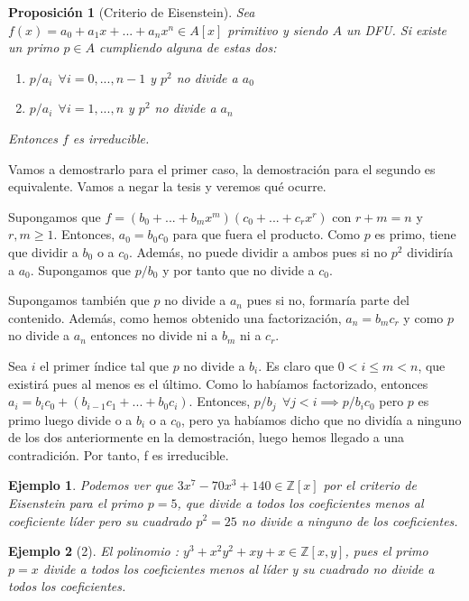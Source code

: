 \documentclass[11pt, a4paper, titlepage]{article}
\makeatletter
\newif\IfInSansMode
\let\oldsf\sffamily
\renewcommand*{\sffamily}{\oldsf\mathversion{sans}\InSansModetrue}
\let\oldnorm\normalfont
\renewcommand*{\normalfont}{\oldnorm\InSansModefalse\mathversion{normal}}
\renewenvironment{proof}[1][\proofname] {\vspace{-15pt}\par\pushQED{\qed}\normalfont\topsep6\p@\@plus6\p@\relax\trivlist\item[\hskip\labelsep\it#1\@addpunct{.}]\ignorespaces}{\popQED\endtrivlist\@endpefalse}
\providecommand{\ent}{\mathbb{Z}}
\renewenvironment{proof}[1][\proofname] {\par\pushQED{\qed}\normalfont\topsep6\p@\@plus6\p@\relax\trivlist\item[\hskip\labelsep\itshape\sffamily#1\@addpunct{.}]\ignorespaces}{\popQED\endtrivlist\@endpefalse}
\theoremstyle{theorem-style}
\newtheorem{nprop}{Proposición}[section]
\theoremstyle{definition-style}
\theoremstyle{remark-style}
\theoremstyle{example-style}
\newtheorem{ejemplo}{Ejemplo}[section]
\makeatother
\begin{document}
\begin{nprop}[Criterio de Eisenstein]
	Sea $f(x)=a_0+a_1x+...+a_nx^n \in A[x]$ primitivo y siendo $A$ un DFU.
Si existe un primo $p\in A$ cumpliendo alguna de estas dos:
	\begin{enumerate}
	\item $p/a_i \ \ \forall i = 0,...,n-1$ y $p^2$ no divide a $a_0$
	\item $p/a_i \ \ \forall i=1,...,n$ y $p^2$ no divide a $a_n$
\end{enumerate}
Entonces $f$ es irreducible.

\end{nprop}
\begin{proof}
	Vamos a demostrarlo para el primer caso, la demostración para el segundo es equivalente. Vamos a negar la tesis y veremos qué ocurre.

	Supongamos que $f=(b_0+...+b_mx^m)(c_0+...+c_rx^r)$ con $r+m=n$ y $r,m \geq 1$. Entonces, $a_0=b_0c_0$ para que fuera el producto. Como $p$ es primo, tiene que dividir a $b_0$ o a $c_0$. Además, no puede dividir a ambos pues si no $p^2$ dividiría a $a_0$. Supongamos que $p/b_0$ y por tanto que no divide a $c_0$.

	Supongamos también que $p$ no divide a $a_n$ pues si no, formaría parte del contenido. Además, como hemos obtenido una factorización, $a_n = b_mc_r$ y como $p$ no divide a $a_n$ entonces no divide ni a $b_m$ ni a $c_r$.

	Sea $i$ el primer índice tal que $p$ no divide a $b_i$. Es claro que $0<i \leq m < n$, que existirá pues al menos es el último. Como lo habíamos factorizado, entonces $a_i = b_ic_0+(b_{i-1}c_1+...+b_0c_i)$. Entonces, $p/b_j \ \ \forall j < i \implies p/b_ic_0$ pero $p$ es primo luego divide o a $b_i$ o a $c_0$, pero ya habíamos dicho que no dividía a ninguno de los dos anteriormente en la demostración, luego hemos llegado a una contradición. Por tanto, f es irreducible.
\end{proof}

\begin{ejemplo}
	Podemos ver que $3x^7-70x^3+140 \in \ent[x]$ por el criterio de Eisenstein para el primo $p=5$, que divide a todos los coeficientes menos al coeficiente líder pero su cuadrado $p^2 = 25$ no divide a ninguno de los coeficientes.
\end{ejemplo}
\begin{ejemplo}[2]
	El polinomio : $y^3 + x^2y^2 +xy + x \in \ent[x,y]$, pues el primo $p=x$ divide a todos los coeficientes menos al líder y su cuadrado no divide a todos los coeficientes.
\end{ejemplo}
\end{document}
